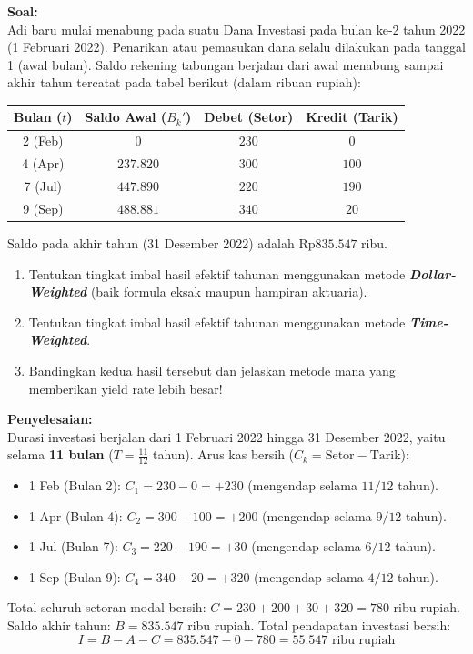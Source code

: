 \documentclass[11pt,a4paper]{article}
\begin{document}
\begin{examplebox}
\textbf{Soal:}\\
Adi baru mulai menabung pada suatu Dana Investasi pada bulan ke-2 tahun 2022 (1 Februari 2022). Penarikan atau pemasukan dana selalu dilakukan pada tanggal 1 (awal bulan). Saldo rekening tabungan berjalan dari awal menabung sampai akhir tahun tercatat pada tabel berikut (dalam ribuan rupiah):

\begin{center}
\renewcommand{\arraystretch}{1.15}
\begin{tabular}{cccc}
\toprule
\textbf{Bulan ($t$)} & \textbf{Saldo Awal ($B_k'$)} & \textbf{Debet (Setor)} & \textbf{Kredit (Tarik)} \\
\midrule
2 (Feb) & $0$ & $230$ & $0$ \\
4 (Apr) & $237.820$ & $300$ & $100$ \\
7 (Jul) & $447.890$ & $220$ & $190$ \\
9 (Sep) & $488.881$ & $340$ & $20$ \\
\bottomrule
\end{tabular}
\end{center}
Saldo pada akhir tahun (31 Desember 2022) adalah $\text{Rp}835.547$ ribu.
\begin{enumerate}[label=(\alph*)]
    \item Tentukan tingkat imbal hasil efektif tahunan menggunakan metode \textbf{\textit{Dollar-Weighted}} (baik formula eksak maupun hampiran aktuaria).
    \item Tentukan tingkat imbal hasil efektif tahunan menggunakan metode \textbf{\textit{Time-Weighted}}.
    \item Bandingkan kedua hasil tersebut dan jelaskan metode mana yang memberikan yield rate lebih besar!
\end{enumerate}

\vspace{0.5em}
\textbf{Penyelesaian:}\\
Durasi investasi berjalan dari 1 Februari 2022 hingga 31 Desember 2022, yaitu selama \textbf{11 bulan} ($T = \frac{11}{12}$ tahun).
Arus kas bersih ($C_k = \text{Setor} - \text{Tarik}$):
\begin{itemize}
    \item 1 Feb (Bulan 2): $C_1 = 230 - 0 = +230$ (mengendap selama $11/12$ tahun).
    \item 1 Apr (Bulan 4): $C_2 = 300 - 100 = +200$ (mengendap selama $9/12$ tahun).
    \item 1 Jul (Bulan 7): $C_3 = 220 - 190 = +30$ (mengendap selama $6/12$ tahun).
    \item 1 Sep (Bulan 9): $C_4 = 340 - 20 = +320$ (mengendap selama $4/12$ tahun).
\end{itemize}
Total seluruh setoran modal bersih: $C = 230 + 200 + 30 + 320 = 780$ ribu rupiah.
Saldo akhir tahun: $B = 835.547$ ribu rupiah.
Total pendapatan investasi bersih:
\begin{equation*}
    I = B - A - C = 835.547 - 0 - 780 = 55.547 \text{ ribu rupiah}
\end{equation*}


\end{examplebox}
\end{document}
